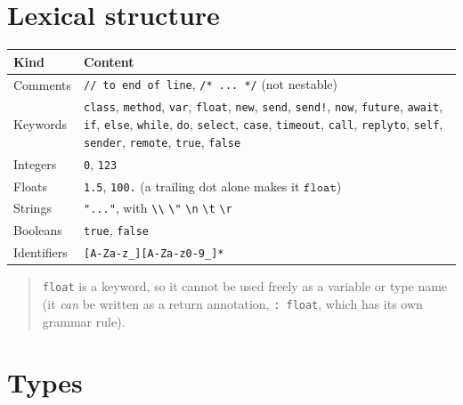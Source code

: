 \documentclass[11pt,a4paper]{article}
\newcommand{\ty}[1]{\ensuremath{\mathtt{#1}}}
\begin{document}
\section{Lexical structure}

\begin{center}
\small
\begin{tabular}{@{}lp{9.5cm}@{}}
\toprule
Kind & Content \\
\midrule
Comments   & \texttt{// to end of line}, \texttt{/* ... */} (not nestable) \\
Keywords   & \texttt{class}, \texttt{method}, \texttt{var}, \texttt{float},
             \texttt{new}, \texttt{send}, \texttt{send!}, \texttt{now},
             \texttt{future}, \texttt{await}, \texttt{if}, \texttt{else},
             \texttt{while}, \texttt{do}, \texttt{select}, \texttt{case},
             \texttt{timeout}, \texttt{call}, \texttt{replyto},
             \texttt{self}, \texttt{sender}, \texttt{remote},
             \texttt{true}, \texttt{false} \\
Integers   & \texttt{0}, \texttt{123} \\
Floats     & \texttt{1.5}, \texttt{100.} (a trailing dot alone makes it \ty{float}) \\
Strings    & \texttt{"..."}, with \texttt{\textbackslash\textbackslash}
             \texttt{\textbackslash"} \texttt{\textbackslash n}
             \texttt{\textbackslash t} \texttt{\textbackslash r} \\
Booleans   & \texttt{true}, \texttt{false} \\
Identifiers & \texttt{[A-Za-z\_][A-Za-z0-9\_]*} \\
\bottomrule
\end{tabular}
\end{center}

\begin{quote}\small
\texttt{float} is a keyword, so it cannot be used freely as a variable or type
name (it \emph{can} be written as a return annotation, \texttt{: float}, which
has its own grammar rule).
\end{quote}

\section{Types}
\end{document}

